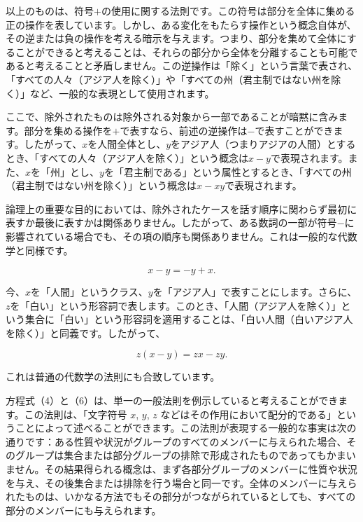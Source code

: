 \documentclass[a4paper,11pt,openany]{ltjsbook}
\begin{document}
以上のものは、符号$+$の使用に関する法則です。この符号は部分を全体に集める正の操作を表しています。しかし、ある変化をもたらす操作という概念自体が、その逆または負の操作を考える暗示を与えます。つまり、部分を集めて全体にすることができると考えることは、それらの部分から全体を分離することも可能であると考えることと矛盾しません。この逆操作は「除く」という言葉で表され、「すべての人々（アジア人を除く）」や「すべての州（君主制ではない州を除く）」など、一般的な表現として使用されます。

ここで、除外されたものは除外される対象から一部であることが暗黙に含みます。部分を集める操作を$+$で表すなら、前述の逆操作は$-$で表すことができます。したがって、$x$を人間全体とし、$y$をアジア人（つまりアジアの人間）とするとき、「すべての人々（アジア人を除く）」という概念は$x - y$で表現されます。また、$x$を「州」とし、$y$を「君主制である」という属性とするとき、「すべての州（君主制ではない州を除く）」という概念は$x - xy$で表現されます。

論理上の重要な目的においては、除外されたケースを話す順序に関わらず最初に表すか最後に表すかは関係ありません。したがって、ある数詞の一部が符号$-$に影響されている場合でも、その項の順序も関係ありません。これは一般的な代数学と同様です。

\begin{equation}
x - y = -y + x.
\end{equation}

今、$x$を「人間」というクラス、$y$を「アジア人」で表すことにします。さらに、$z$を「白い」という形容詞で表します。このとき、「人間（アジア人を除く）」という集合に「白い」という形容詞を適用することは、「白い人間（白いアジア人を除く）」と同義です。したがって、

\begin{equation}
z(x - y) = zx - zy.
\end{equation}

これは普通の代数学の法則にも合致しています。

方程式（4）と（6）は、単一の一般法則を例示していると考えることができます。この法則は、「文字符号 $x$, $y$, $z$ などはその作用において配分的である」ということによって述べることができます。この法則が表現する一般的な事実は次の通りです：ある性質や状況がグループのすべてのメンバーに与えられた場合、そのグループは集合または部分グループの排除で形成されたものであってもかまいません。その結果得られる概念は、まず各部分グループのメンバーに性質や状況を与え、その後集合または排除を行う場合と同一です。全体のメンバーに与えられたものは、いかなる方法でもその部分がつながられているとしても、すべての部分のメンバーにも与えられます。
\end{document}
